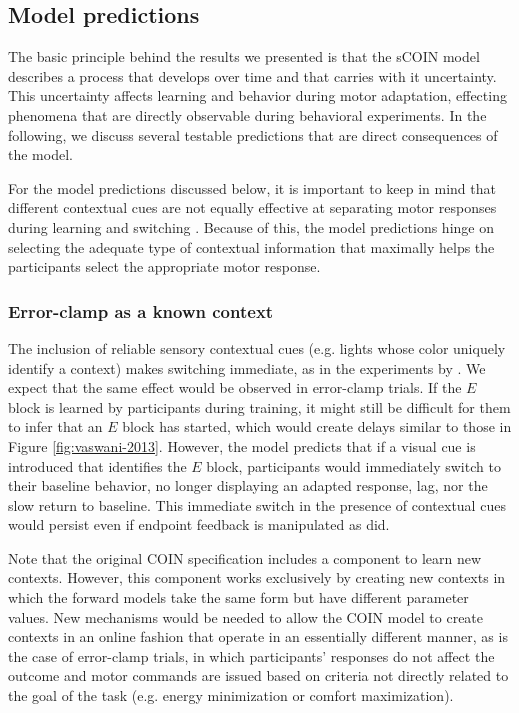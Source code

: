 \documentclass[a4paper,doc,floatsintext,natbib]{apa6}
\def \fref #1{Figure \ref{#1}}     %
\begin{document}
\subsection{Model predictions}
The basic principle behind the results we presented is that the sCOIN model describes a process that develops over time and that carries with it uncertainty. This uncertainty affects learning and behavior during motor adaptation, effecting phenomena that are directly observable during behavioral experiments. In the following, we discuss several testable predictions that are direct consequences of the model.

For the model predictions discussed below, it is important to keep in mind that different contextual cues are not equally effective at separating motor responses during learning and switching \citep{Howard_Gone_2012,Howard_ContextDependent_2010,Imamizu_Explicit_2007}. Because of this, the model predictions hinge on selecting the adequate type of contextual information that maximally helps the participants select the appropriate motor response.


\subsubsection{Error-clamp as a known context}
The inclusion of reliable sensory contextual cues (e.g. lights whose color uniquely identify a context) makes switching immediate, as in the experiments by \cite{Kim_Neural_2015}. We expect that the same effect would be observed in error-clamp trials. If the $E$ block is learned by participants during training, it might still be difficult for them to infer that an $E$ block has started, which would create delays similar to those in \fref{fig:vaswani-2013}. However, the model predicts that if a visual cue is introduced that identifies the $E$ block, participants would immediately switch to their baseline behavior, no longer displaying an adapted response, lag, nor the slow return to baseline. This immediate switch in the presence of contextual cues would persist even if endpoint feedback is manipulated as \cite{Vaswani_Decay_2013} did.

Note that the original COIN specification includes a component to learn new contexts. However, this component works exclusively by creating new contexts in which the forward models take the same form but have different parameter values. New mechanisms would be needed to allow the COIN model to create contexts in an online fashion that operate in an essentially different manner, as is the case of error-clamp trials, in which participants' responses do not affect the outcome and motor commands are issued based on criteria not directly related to the goal of the task (e.g. energy minimization or comfort maximization).
\end{document}
